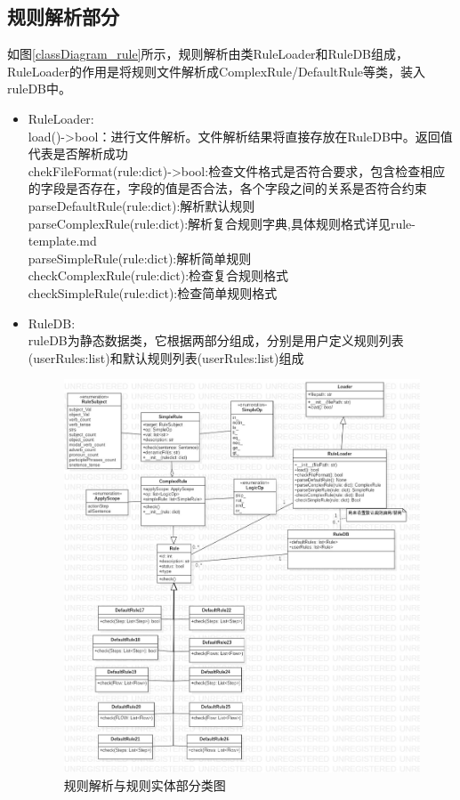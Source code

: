     \subsection{规则解析部分}
   		如图\ref{classDiagram_rule}所示，规则解析由类RuleLoader和RuleDB组成，RuleLoader的作用是将规则文件解析成ComplexRule/DefaultRule等类，装入ruleDB中。\\
    \begin{itemize}
    	

    	\item 	RuleLoader:\\
    	load()->bool：进行文件解析。文件解析结果将直接存放在RuleDB中。返回值代表是否解析成功\\
    	chekFileFormat(rule:dict)->bool:检查文件格式是否符合要求，包含检查相应的字段是否存在，字段的值是否合法，各个字段之间的关系是否符合约束\\
    	parseDefaultRule(rule:dict):解析默认规则\\
    	parseComplexRule(rule:dict):解析复合规则字典,具体规则格式详见rule-template.md\\
    	parseSimpleRule(rule:dict):解析简单规则\\
    	checkComplexRule(rule:dict):检查复合规则格式\\
    	checkSimpleRule(rule:dict):检查简单规则格式
    	\item 	RuleDB:\\
    	ruleDB为静态数据类，它根据两部分组成，分别是用户定义规则列表(userRules:list)和默认规则列表(userRules:list)组成\\
    	\begin{figure}
    		\centering
    		\includegraphics[width=1\textwidth]{./src/classDiagram_rule.jpg} 
    		\caption{规则解析与规则实体部分类图} 
    	\end{figure}
    \end{itemize}

